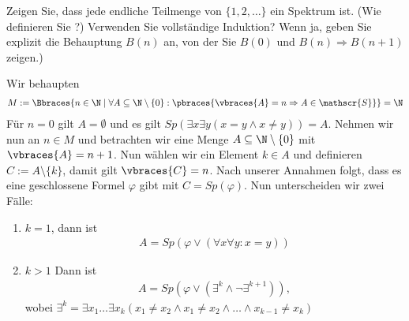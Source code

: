 
\begin{exercise}[71]

\phantom{}
	Zeigen Sie, dass jede endliche Teilmenge von  $\{1,2, \dots \}$ ein Spektrum ist. (Wie definieren Sie ?) Verwenden Sie vollständige Induktion? Wenn ja, geben Sie explizit die Behauptung $B(n)$ an, von der Sie $B(0)$ und $B(n) \Rightarrow B(n + 1)$ zeigen.)

\end{exercise}


\begin{solution}

\phantom{}
	Wir behaupten
	\begin{align*}
	M := \Bbraces{n \in \N \mid \forall A \subseteq \N \setminus \{0\}: \pbraces{\vbraces{A} = n \Rightarrow  A \in \mathscr{S}}} = \N
	\end{align*}
	Für $n = 0$ gilt $A = \emptyset$ und es gilt $Sp(\exists x \exists y(x = y \land x \neq y)) = A$. \newline
	Nehmen wir nun an $n \in M$ und betrachten wir eine Menge $A \subseteq \N \setminus \{0\}$ mit $\vbraces{A} = n + 1$. Nun wählen wir ein Element $k \in A$ und definieren $C := A \setminus \{k\}$, damit gilt $\vbraces{C} = n$. Nach unserer Annahmen folgt, dass es eine geschlossene Formel $\varphi$ gibt mit $C = Sp(\varphi)$. Nun unterscheiden wir zwei Fälle:
	\begin{enumerate}[label = Fall \arabic*:]
		\item $k = 1$, dann ist
			\begin{align*}
			A = Sp(\varphi \lor (\forall x \forall y: x = y))
			\end{align*}
		\item $k > 1$ Dann ist
			\begin{align*}
			A = Sp(\varphi \lor (\exists^k \land \neg \exists^{k + 1})),
			\end{align*}
			wobei $\exists^k = \exists x_1 \dots \exists x_k (x_1 \neq x_2 \land x_1 \neq x_2 \land \dots \land x_{k - 1} \neq x_k)$
	\end{enumerate}
\end{solution}
